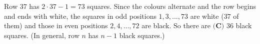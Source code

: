 Row $37$ has $2\cdot37-1=73$ squares. Since the colours alternate and the row begins and ends with white, the squares in odd positions $1,3,\dots,73$ are white ($37$ of them) and those in even positions $2,4,\dots,72$ are black. So there are $\boxed{\textbf{(C) }36}$ black squares. (In general, row $n$ has $n-1$ black squares.)
